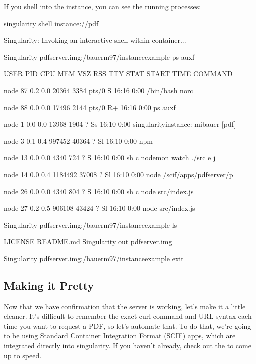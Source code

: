 \documentclass[letterpaper,10pt,english]{sphinxmanual}
\begin{document}
If you shell into the instance, you can see the running processes:

%
\begin{sphinxVerbatim}[commandchars=\\\{\}]
\PYGZdl{} singularity shell instance://pdf

Singularity: Invoking an interactive shell within container...


Singularity pdf\PYGZus{}server.img:\PYGZti{}/bauerm97/instance\PYGZhy{}example\PYGZgt{} ps auxf

USER       PID \PYGZpc{}CPU \PYGZpc{}MEM    VSZ   RSS TTY      STAT START   TIME COMMAND

node        87  0.2  0.0  20364  3384 pts/0    S    16:16   0:00 /bin/bash \PYGZhy{}\PYGZhy{}norc

node        88  0.0  0.0  17496  2144 pts/0    R+   16:16   0:00  \PYGZbs{}\PYGZus{} ps auxf

node         1  0.0  0.0  13968  1904 ?        Ss   16:10   0:00 singularity\PYGZhy{}instance: mibauer [pdf]

node         3  0.1  0.4 997452 40364 ?        Sl   16:10   0:00 npm

node        13  0.0  0.0   4340   724 ?        S    16:10   0:00  \PYGZbs{}\PYGZus{} sh \PYGZhy{}c nodemon \PYGZhy{}\PYGZhy{}watch ./src \PYGZhy{}e j

node        14  0.0  0.4 1184492 37008 ?       Sl   16:10   0:00      \PYGZbs{}\PYGZus{} node /scif/apps/pdf\PYGZus{}server/p

node        26  0.0  0.0   4340   804 ?        S    16:10   0:00          \PYGZbs{}\PYGZus{} sh \PYGZhy{}c node src/index.js

node        27  0.2  0.5 906108 43424 ?        Sl   16:10   0:00              \PYGZbs{}\PYGZus{} node src/index.js

Singularity pdf\PYGZus{}server.img:\PYGZti{}/bauerm97/instance\PYGZhy{}example\PYGZgt{} ls

LICENSE  README.md  Singularity  out  pdf\PYGZus{}server.img

Singularity pdf\PYGZus{}server.img:\PYGZti{}/bauerm97/instance\PYGZhy{}example\PYGZgt{} exit
\end{sphinxVerbatim}


\subsection{Making it Pretty}
\label{\detokenize{running_services:making-it-pretty}}
Now that we have confirmation that the server is working, let’s make
it a little cleaner. It’s difficult to remember the exact curl command
and URL syntax each time you want to request a PDF, so let’s automate
that. To do that, we’re going to be using Standard Container
Integration Format (SCIF) apps, which are integrated directly into
singularity. If you haven’t already, check out the {\hyperref[\detokenize{reproducible_scif_apps:reproducible-scif-apps}]{}} to come up to
speed.
\end{document}
